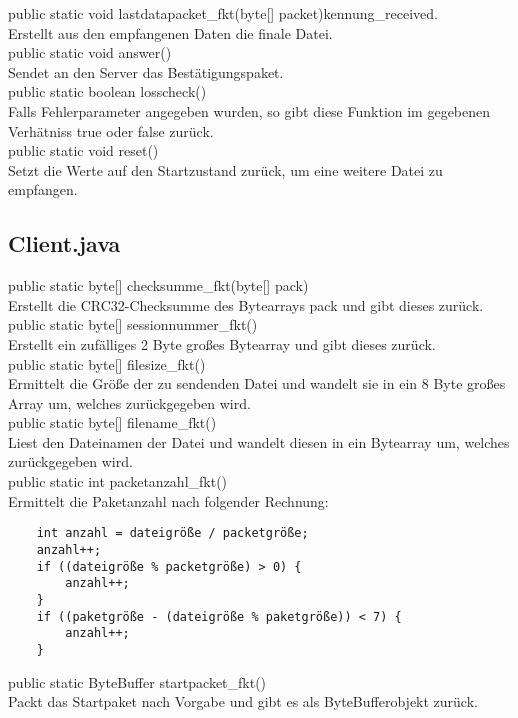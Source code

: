 \documentclass[12pt]{article}
\begin{document}
public static void lastdatapacket\_fkt(byte[] packet)kennung\_received.\\
Erstellt aus den empfangenen Daten die finale Datei.\\

public static void answer()\\
Sendet an den Server das Bestätigungspaket.\\

public static boolean losscheck()\\
Falls Fehlerparameter angegeben wurden, so gibt diese Funktion im gegebenen Verhätniss true oder false zurück.\\

public static void reset()\\
Setzt die Werte auf den Startzustand zurück, um eine weitere Datei zu empfangen.\\

\subsection{Client.java}

public static byte[] checksumme\_fkt(byte[] pack)\\
Erstellt die CRC32-Checksumme des Bytearrays pack und gibt dieses zurück.\\

public static byte[] sessionnummer\_fkt()\\
Erstellt ein zufälliges 2 Byte großes Bytearray und gibt dieses zurück.\\

public static byte[] filesize\_fkt()\\
Ermittelt die Größe der zu sendenden Datei und wandelt sie in ein 8 Byte großes Array um, welches zurückgegeben wird.\\

public static byte[] filename\_fkt()\\
Liest den Dateinamen der Datei und wandelt diesen in ein Bytearray um, welches zurückgegeben wird.\\

public static int packetanzahl\_fkt()\\
Ermittelt die Paketanzahl nach folgender Rechnung:\\
\begin{verbatim}
    int anzahl = dateigröße / packetgröße;
    anzahl++;
    if ((dateigröße % packetgröße) > 0) {
        anzahl++;
    }
    if ((paketgröße - (dateigröße % paketgröße)) < 7) {
        anzahl++;
    }
\end{verbatim}
public static ByteBuffer startpacket\_fkt()\\
Packt das Startpaket nach Vorgabe und gibt es als ByteBufferobjekt zurück.  \\
\end{document}
